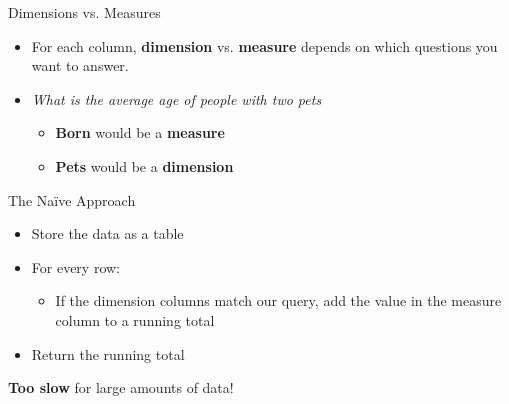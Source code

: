 \documentclass{beamer}
\theoremstyle{definition}
\theoremstyle{definition}
\begin{document}
\begin{frame}{Dimensions vs. Measures}
    \begin{itemize}
        \item<+-> For each column, \textbf{dimension} vs. \textbf{measure} depends on which questions you want to answer.
        \item<+-> \textit{What is the average age of people with two pets}
        \pause
        \begin{itemize}
            \item \textbf{Born} would be a \textbf{measure}
            \item \textbf{Pets} would be a \textbf{dimension}
        \end{itemize}
    \end{itemize}
\end{frame}

\begin{frame}{The Na\"{i}ve Approach}
    \begin{itemize}
        \item Store the data as a table
        \item For every row:
        \begin{itemize}
            \item If the dimension columns match our query, add the value in the measure column to a running total
        \end{itemize}
        \item Return the running total
    \end{itemize}
    \pause
    \textbf{Too slow} for large amounts of data!
\end{frame}
\end{document}
